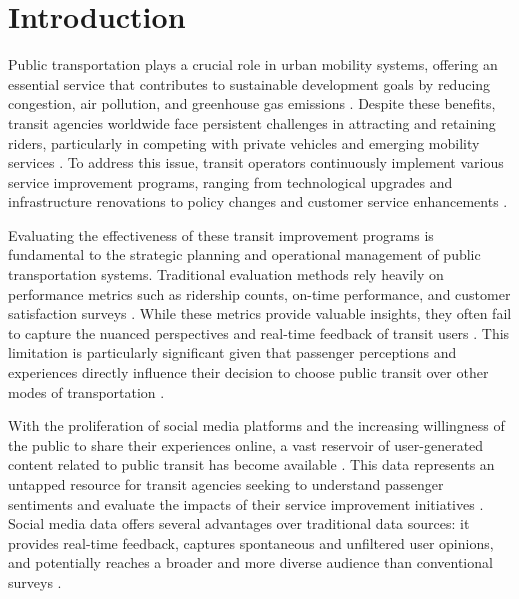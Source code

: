 \documentclass[a4paper,fleqn,12pt]{cas-sc}
\begin{document}
\maketitle
\setlength{\parindent}{15pt}
\setlength{\parskip}{0.1in}
\linenumbers

\section{Introduction}\label{sec:introduction}

Public transportation plays a crucial role in urban mobility systems, offering an essential service that contributes to sustainable development goals by reducing congestion, air pollution, and greenhouse gas emissions \citep{stjernborg2016role, mead2021road}. Despite these benefits, transit agencies worldwide face persistent challenges in attracting and retaining riders, particularly in competing with private vehicles and emerging mobility services \citep{beirAo2007understanding}. To address this issue, transit operators continuously implement various service improvement programs, ranging from technological upgrades and infrastructure renovations to policy changes and customer service enhancements \citep{luong2015public, fraser2024using}. 

Evaluating the effectiveness of these transit improvement programs is fundamental to the strategic planning and operational management of public transportation systems. Traditional evaluation methods rely heavily on performance metrics such as ridership counts, on-time performance, and customer satisfaction surveys \citep{nathanail2008measuring, eboli2011methodology}. While these metrics provide valuable insights, they often fail to capture the nuanced perspectives and real-time feedback of transit users \citep{collins2013novel}. This limitation is particularly significant given that passenger perceptions and experiences directly influence their decision to choose public transit over other modes of transportation \citep{friman2001frequency, morton2016customer}.

With the proliferation of social media platforms and the increasing willingness of the public to share their experiences online, a vast reservoir of user-generated content related to public transit has become available \citep{golder2011diurnal, kaplan2010users}. This data represents an untapped resource for transit agencies seeking to understand passenger sentiments and evaluate the impacts of their service improvement initiatives \citep{el2019linking, zhang2023changes}. Social media data offers several advantages over traditional data sources: it provides real-time feedback, captures spontaneous and unfiltered user opinions, and potentially reaches a broader and more diverse audience than conventional surveys \citep{tasse2014using, haghighi2018using}.
\end{document}
